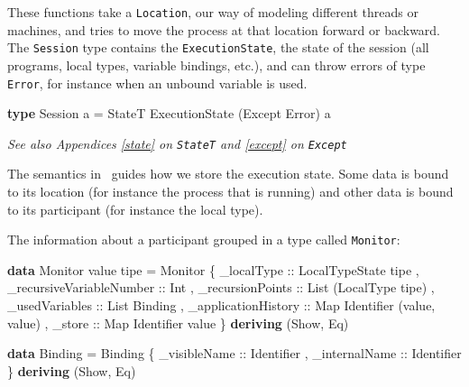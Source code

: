 \documentclass[runningheads,plain]{llncs}
\newenvironment{Shaded}{}{}
\newcommand{\KeywordTok}[1]{\textcolor[rgb]{0.00,0.44,0.13}{\textbf{#1}}}
\newcommand{\DataTypeTok}[1]{\textcolor[rgb]{0.56,0.13,0.00}{#1}}
\newcommand{\OtherTok}[1]{\textcolor[rgb]{0.00,0.44,0.13}{#1}}
\newcommand{\FunctionTok}[1]{\textcolor[rgb]{0.02,0.16,0.49}{#1}}
\newcommand{\NormalTok}[1]{#1}
\begin{document}
These functions take a \texttt{Location}, our way of modeling different
threads or machines, and tries to move the process at that location
forward or backward. The \texttt{Session} type contains the
\texttt{ExecutionState}, the state of the session (all programs, local
types, variable bindings, etc.), and can throw errors of type
\texttt{Error}, for instance when an unbound variable is used.

\begin{Shaded}
\begin{Highlighting}[]
\KeywordTok{type} \DataTypeTok{Session}\NormalTok{ a }\FunctionTok{=} \DataTypeTok{StateT} \DataTypeTok{ExecutionState}\NormalTok{ (}\DataTypeTok{Except} \DataTypeTok{Error}\NormalTok{) a}
\end{Highlighting}
\end{Shaded}

\emph{See also Appendices \ref{state} on \texttt{StateT} and
\ref{except} on \texttt{Except}}

The semantics in~\cite{DBLP:conf/ppdp/MezzinaP17} guides how we store the execution
state. Some data is bound to its location (for instance the process that
is running) and other data is bound to its participant (for instance the
local type).

The information about a participant grouped in a type called
\texttt{Monitor}:

\begin{Shaded}
\begin{Highlighting}[]
\KeywordTok{data} \DataTypeTok{Monitor}\NormalTok{ value tipe }\FunctionTok{=} 
    \DataTypeTok{Monitor} 
\NormalTok{        \{}\OtherTok{ _localType ::} \DataTypeTok{LocalTypeState}\NormalTok{ tipe}
\NormalTok{        ,}\OtherTok{ _recursiveVariableNumber ::} \DataTypeTok{Int}
\NormalTok{        ,}\OtherTok{ _recursionPoints ::} \DataTypeTok{List}\NormalTok{ (}\DataTypeTok{LocalType}\NormalTok{ tipe)}
\NormalTok{        ,}\OtherTok{ _usedVariables ::} \DataTypeTok{List} \DataTypeTok{Binding} 
\NormalTok{        ,}\OtherTok{ _applicationHistory ::} \DataTypeTok{Map} \DataTypeTok{Identifier}\NormalTok{ (value, value)}
\NormalTok{        ,}\OtherTok{ _store ::} \DataTypeTok{Map} \DataTypeTok{Identifier}\NormalTok{ value }
\NormalTok{        \}}
        \KeywordTok{deriving}\NormalTok{ (}\DataTypeTok{Show}\NormalTok{, }\DataTypeTok{Eq}\NormalTok{)}

\KeywordTok{data} \DataTypeTok{Binding} \FunctionTok{=} 
    \DataTypeTok{Binding} 
\NormalTok{        \{}\OtherTok{ _visibleName ::} \DataTypeTok{Identifier}
\NormalTok{        ,}\OtherTok{ _internalName ::} \DataTypeTok{Identifier} 
\NormalTok{        \}}
    \KeywordTok{deriving}\NormalTok{ (}\DataTypeTok{Show}\NormalTok{, }\DataTypeTok{Eq}\NormalTok{) }
\end{Highlighting}
\end{Shaded}
\end{document}
